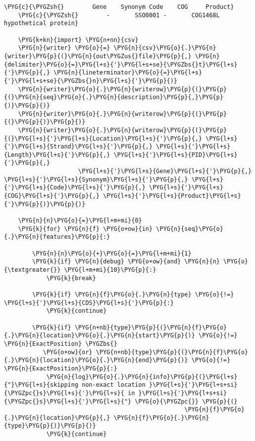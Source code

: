 \begin{Verbatim}[commandchars=\\\{\}]
    \PYG{c}{\PYGZsh{}        Gene    Synonym Code    COG     Product}
    \PYG{c}{\PYGZsh{}        -       SSO0001 -       COG1468L        hypothetical protein}

    \PYG{k+kn}{import} \PYG{n+nn}{csv}
    \PYG{n}{writer} \PYG{o}{=} \PYG{n}{csv}\PYG{o}{.}\PYG{n}{writer}\PYG{p}{(}\PYG{n}{out\PYGZus{}file}\PYG{p}{,} \PYG{n}{delimiter}\PYG{o}{=}\PYG{l+s}{'}\PYG{l+s+se}{\PYGZbs{}t}\PYG{l+s}{'}\PYG{p}{,} \PYG{n}{lineterminator}\PYG{o}{=}\PYG{l+s}{'}\PYG{l+s+se}{\PYGZbs{}n}\PYG{l+s}{'}\PYG{p}{)}
    \PYG{n}{writer}\PYG{o}{.}\PYG{n}{writerow}\PYG{p}{(}\PYG{p}{(}\PYG{n}{seq}\PYG{o}{.}\PYG{n}{description}\PYG{p}{,}\PYG{p}{)}\PYG{p}{)}
    \PYG{n}{writer}\PYG{o}{.}\PYG{n}{writerow}\PYG{p}{(}\PYG{p}{(}\PYG{p}{)}\PYG{p}{)}
    \PYG{n}{writer}\PYG{o}{.}\PYG{n}{writerow}\PYG{p}{(}\PYG{p}{(}\PYG{l+s}{'}\PYG{l+s}{Location}\PYG{l+s}{'}\PYG{p}{,} \PYG{l+s}{'}\PYG{l+s}{Strand}\PYG{l+s}{'}\PYG{p}{,} \PYG{l+s}{'}\PYG{l+s}{Length}\PYG{l+s}{'}\PYG{p}{,} \PYG{l+s}{'}\PYG{l+s}{PID}\PYG{l+s}{'}\PYG{p}{,}
                     \PYG{l+s}{'}\PYG{l+s}{Gene}\PYG{l+s}{'}\PYG{p}{,} \PYG{l+s}{'}\PYG{l+s}{Synonym}\PYG{l+s}{'}\PYG{p}{,} \PYG{l+s}{'}\PYG{l+s}{Code}\PYG{l+s}{'}\PYG{p}{,} \PYG{l+s}{'}\PYG{l+s}{COG}\PYG{l+s}{'}\PYG{p}{,} \PYG{l+s}{'}\PYG{l+s}{Product}\PYG{l+s}{'}\PYG{p}{)}\PYG{p}{)}

    \PYG{n}{n}\PYG{o}{=}\PYG{l+m+mi}{0}
    \PYG{k}{for} \PYG{n}{f} \PYG{o+ow}{in} \PYG{n}{seq}\PYG{o}{.}\PYG{n}{features}\PYG{p}{:}

        \PYG{n}{n}\PYG{o}{+}\PYG{o}{=}\PYG{l+m+mi}{1}
        \PYG{k}{if} \PYG{n}{debug} \PYG{o+ow}{and} \PYG{n}{n} \PYG{o}{\textgreater{}} \PYG{l+m+mi}{10}\PYG{p}{:}
            \PYG{k}{break}

        \PYG{k}{if} \PYG{n}{f}\PYG{o}{.}\PYG{n}{type} \PYG{o}{!=} \PYG{l+s}{'}\PYG{l+s}{CDS}\PYG{l+s}{'}\PYG{p}{:}
            \PYG{k}{continue}

        \PYG{k}{if} \PYG{n+nb}{type}\PYG{p}{(}\PYG{n}{f}\PYG{o}{.}\PYG{n}{location}\PYG{o}{.}\PYG{n}{start}\PYG{p}{)} \PYG{o}{!=} \PYG{n}{ExactPosition} \PYGZbs{}
           \PYG{o+ow}{or} \PYG{n+nb}{type}\PYG{p}{(}\PYG{n}{f}\PYG{o}{.}\PYG{n}{location}\PYG{o}{.}\PYG{n}{end}\PYG{p}{)} \PYG{o}{!=} \PYG{n}{ExactPosition}\PYG{p}{:}
            \PYG{n}{log}\PYG{o}{.}\PYG{n}{info}\PYG{p}{(}\PYG{l+s}{"}\PYG{l+s}{skipping non-exact location }\PYG{l+s}{'}\PYG{l+s+si}{\PYGZpc{}s}\PYG{l+s}{'}\PYG{l+s}{ in }\PYG{l+s}{'}\PYG{l+s+si}{\PYGZpc{}s}\PYG{l+s}{'}\PYG{l+s}{"} \PYG{o}{\PYGZpc{}} \PYG{p}{(}
                                                   \PYG{n}{f}\PYG{o}{.}\PYG{n}{location}\PYG{p}{,} \PYG{n}{f}\PYG{o}{.}\PYG{n}{type}\PYG{p}{)}\PYG{p}{)}
            \PYG{k}{continue}


\end{Verbatim}
